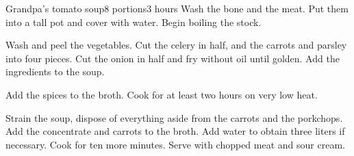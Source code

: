 \documentclass{article}
\begin{document}
\begin{recipe}{Grandpa's tomato soup}{8 portions}{3 hours}
Wash the bone and the meat. Put them into a tall pot and cover with water.
Begin boiling the stock.

Wash and peel the vegetables. Cut the celery in half, and the carrots and parsley into four pieces.
Cut the onion in half and fry without oil until golden. Add the ingredients to the soup. 

Add the spices to the broth. Cook for at least two hours on very low heat.

Strain the soup, dispose of everything aside from the carrots and the porkchops. Add the concentrate and
carrots to the broth. Add water to obtain three liters if necessary. Cook for ten more minutes. 
Serve with chopped meat and sour cream.

\end{recipe}
\end{document}
